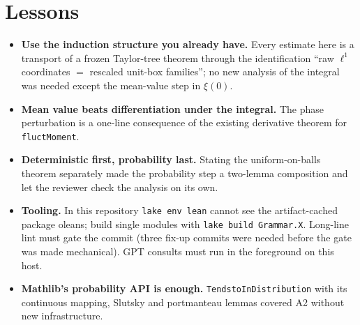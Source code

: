 \documentclass[11pt]{article}
\begin{document}
\section{Lessons}
\begin{itemize}
\item \textbf{Use the induction structure you already have.} Every estimate here is a transport of a
frozen Taylor-tree theorem through the identification ``raw $\ell^1$ coordinates $=$ rescaled unit-box
families''; no new analysis of the integral was needed except the mean-value step in $\xi(0)$.
\item \textbf{Mean value beats differentiation under the integral.} The phase perturbation is a
one-line consequence of the existing derivative theorem for \texttt{fluctMoment}.
\item \textbf{Deterministic first, probability last.} Stating the uniform-on-balls theorem separately
made the probability step a two-lemma composition and let the reviewer check the analysis on its own.
\item \textbf{Tooling.} In this repository \texttt{lake env lean} cannot see the artifact-cached
package oleans; build single modules with \texttt{lake build Grammar.X}. Long-line lint must gate the
commit (three fix-up commits were needed before the gate was made mechanical). GPT consults must run in
the foreground on this host.
\item \textbf{Mathlib's probability API is enough.} \texttt{TendstoInDistribution} with its continuous
mapping, Slutsky and portmanteau lemmas covered A2 without new infrastructure.
\end{itemize}
\end{document}
